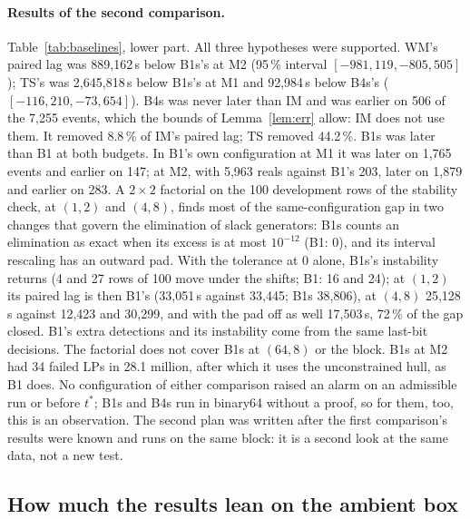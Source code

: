 \documentclass[11pt,a4paper]{article}
\newcommand{\tstar}{t^{\ast}}
\begin{document}
\paragraph{Results of the second comparison.} Table~\ref{tab:baselines}, lower part. All three hypotheses were
supported. WM's paired lag was 889,162\,s below B1s's at M2 (95\,\% interval $[-981{,}119, -805{,}505]$); TS's was
2,645,818\,s below B1s's at M1 and 92,984\,s below B4s's ($[-116{,}210, -73{,}654]$). B4s was never later than IM and
was earlier on 506 of the 7,255 events, which the bounds of Lemma~\ref{lem:err} allow: IM does not use them. It
removed 8.8\,\% of IM's paired lag; TS removed 44.2\,\%. B1s was later than B1 at both budgets. In B1's own
configuration at M1 it was later on 1,765 events and earlier on 147; at M2, with 5,963 reals against B1's 203, later on
1,879 and earlier on 283. A $2\times2$ factorial on the 100 development rows of the stability check, at $(1,2)$ and
$(4,8)$, finds most of the same-configuration gap in two changes that govern the elimination of slack generators:
B1s counts an elimination as exact when its excess is at most $10^{-12}$ (B1: 0), and its interval rescaling has an
outward pad. With the tolerance at 0 alone, B1s's instability returns (4 and 27 rows of 100 move under the shifts;
B1: 16 and 24); at $(1,2)$ its paired lag is then B1's (33,051\,s against 33,445; B1s 38,806), at $(4,8)$ 25,128\,s
against 12,423 and 30,299, and with the pad off as well 17,503\,s, 72\,\% of the gap closed. B1's extra detections
and its instability come from the same last-bit decisions. The factorial does not cover B1s at $(64,8)$ or the
block. B1s at M2 had 34 failed LPs
in 28.1 million, after which it uses the unconstrained hull, as B1 does. No configuration of either comparison raised
an alarm on an admissible run or before $\tstar$; B1s and B4s run in binary64 without a proof, so for them, too, this
is an observation. The second plan was written after the first comparison's results were known and runs on the same
block: it is a second look at the same data, not a new test.

\subsection{How much the results lean on the ambient box}\label{sec:ambient}
\end{document}
